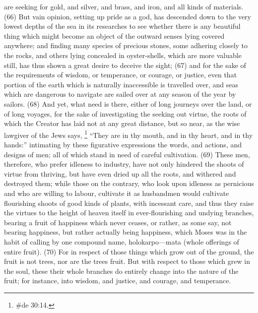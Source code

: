 are seeking for gold, and silver, and brass, and iron, and all kinds of materials. (66) But vain
opinion, setting up pride as a god, has descended down to the very lowest depths of the sea in its
researches to see whether there is any beautiful thing which might become an object of the
outward senses lying covered anywhere; and finding many species of precious stones, some
adhering closely to the rocks, and others lying concealed in oyster-shells, which are more valuable
still, has thus shown a great desire to deceive the sight; (67) and for the sake of the requirements
of wisdom, or temperance, or courage, or justice, even that portion of the earth which is naturally
inaccessible is travelled over, and seas which are dangerous to navigate are sailed over at any
season of the year by sailors. (68) And yet, what need is there, either of long journeys over the
land, or of long voyages, for the sake of investigating the seeking out virtue, the roots of which the
Creator has laid not at any great distance, but so near, as the wise lawgiver of the Jews
says, \footnote{\#de 30:14.} ``They are in thy mouth, and in thy heart, and in thy hands:'' intimating by
these figurative expressions the words, and actions, and designs of men; all of which stand in need
of careful cultivation. (69) These men, therefore, who prefer idleness to industry, have not only
hindered the shoots of virtue from thriving, but have even dried up all the roots, and withered and
destroyed them; while those on the contrary, who look upon idleness as pernicious and who are
willing to labour, cultivate it as husbandmen would cultivate flourishing shoots of good kinds of
plants, with incessant care, and thus they raise the virtues to the height of heaven itself in
ever-flourishing and undying branches, bearing a fruit of happiness which never ceases, or rather,
as some say, not bearing happiness, but rather actually being happiness, which Moses was in the
habit of calling by one compound name, holokarpo—mata (whole offerings of entire fruit). (70) For
in respect of those things which grow out of the ground, the fruit is not trees, nor are the trees fruit.
But with respect to those which grew in the soul, these their whole branches do entirely change into
the nature of the fruit; for instance, into wisdom, and justice, and courage, and temperance.

